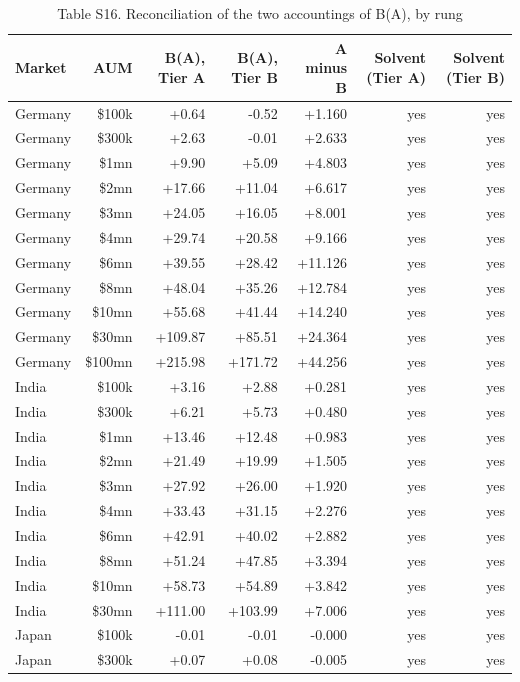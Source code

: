 \begin{table}[t]
\centering
\small
\caption{Table S16. Reconciliation of the two accountings of B(A), by rung}
\label{tab:s16}
\begin{tabular}{lrrrrrr}
\toprule
Market & AUM & B(A), Tier A & B(A), Tier B & A minus B & Solvent (Tier A) & Solvent (Tier B) \\
\midrule
Germany & \$100k & +0.64 & -0.52 & +1.160 & yes & yes \\
Germany & \$300k & +2.63 & -0.01 & +2.633 & yes & yes \\
Germany & \$1mn & +9.90 & +5.09 & +4.803 & yes & yes \\
Germany & \$2mn & +17.66 & +11.04 & +6.617 & yes & yes \\
Germany & \$3mn & +24.05 & +16.05 & +8.001 & yes & yes \\
Germany & \$4mn & +29.74 & +20.58 & +9.166 & yes & yes \\
Germany & \$6mn & +39.55 & +28.42 & +11.126 & yes & yes \\
Germany & \$8mn & +48.04 & +35.26 & +12.784 & yes & yes \\
Germany & \$10mn & +55.68 & +41.44 & +14.240 & yes & yes \\
Germany & \$30mn & +109.87 & +85.51 & +24.364 & yes & yes \\
Germany & \$100mn & +215.98 & +171.72 & +44.256 & yes & yes \\
India & \$100k & +3.16 & +2.88 & +0.281 & yes & yes \\
India & \$300k & +6.21 & +5.73 & +0.480 & yes & yes \\
India & \$1mn & +13.46 & +12.48 & +0.983 & yes & yes \\
India & \$2mn & +21.49 & +19.99 & +1.505 & yes & yes \\
India & \$3mn & +27.92 & +26.00 & +1.920 & yes & yes \\
India & \$4mn & +33.43 & +31.15 & +2.276 & yes & yes \\
India & \$6mn & +42.91 & +40.02 & +2.882 & yes & yes \\
India & \$8mn & +51.24 & +47.85 & +3.394 & yes & yes \\
India & \$10mn & +58.73 & +54.89 & +3.842 & yes & yes \\
India & \$30mn & +111.00 & +103.99 & +7.006 & yes & yes \\
Japan & \$100k & -0.01 & -0.01 & -0.000 & yes & yes \\
Japan & \$300k & +0.07 & +0.08 & -0.005 & yes & yes \\

\end{tabular}
\end{table}
